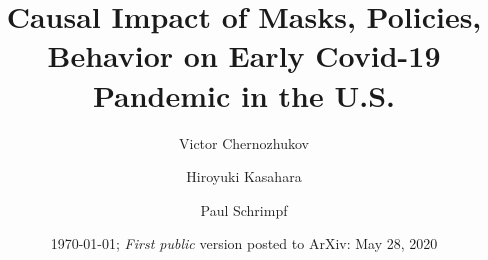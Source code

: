 \documentclass[3p, longtitle]{elsarticle}
\theoremstyle{definition}
\begin{document}
\title{Causal Impact of Masks, Policies, Behavior on Early Covid-19
  Pandemic in the U.S.}



\author{Victor Chernozhukov}
\address{Department of Economics and Center for Statistics and Data
  Science, MIT,  MA 02139}

\author{Hiroyuki Kasahara }
\address{Vancouver School of Economics, UBC, 6000 Iona Drive, Vancouver, BC.}
\author{Paul Schrimpf}
\address{Vancouver School of Economics, UBC, 6000 Iona Drive, Vancouver, BC.}



\date{\today; \textit{First public} version posted to ArXiv:  May 28, 2020}
\end{document}
